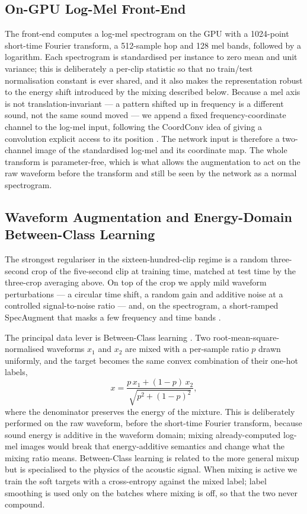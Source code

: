 \documentclass[conference]{IEEEtran}
\begin{document}
\subsection{On-GPU Log-Mel Front-End}
The front-end computes a log-mel spectrogram on the GPU with a 1024-point short-time Fourier transform, a 512-sample hop and 128 mel bands, followed by a logarithm. Each spectrogram is standardised per instance to zero mean and unit variance; this is deliberately a per-clip statistic so that no train/test normalisation constant is ever shared, and it also makes the representation robust to the energy shift introduced by the mixing described below. Because a mel axis is not translation-invariant --- a pattern shifted up in frequency is a different sound, not the same sound moved --- we append a fixed frequency-coordinate channel to the log-mel input, following the CoordConv idea of giving a convolution explicit access to its position \cite{liu_coordconv}. The network input is therefore a two-channel image of the standardised log-mel and its coordinate map. The whole transform is parameter-free, which is what allows the augmentation to act on the raw waveform before the transform and still be seen by the network as a normal spectrogram.

\subsection{Waveform Augmentation and Energy-Domain Between-Class Learning}\label{sec:aug}
The strongest regulariser in the sixteen-hundred-clip regime is a random three-second crop of the five-second clip at training time, matched at test time by the three-crop averaging above. On top of the crop we apply mild waveform perturbations --- a circular time shift, a random gain and additive noise at a controlled signal-to-noise ratio --- and, on the spectrogram, a short-ramped SpecAugment that masks a few frequency and time bands \cite{park_specaugment}.

The principal data lever is Between-Class learning \cite{tokozume_bc}. Two root-mean-square-normalised waveforms $x_1$ and $x_2$ are mixed with a per-sample ratio $p$ drawn uniformly, and the target becomes the same convex combination of their one-hot labels,
\begin{equation}
x = \frac{p\,x_1 + (1-p)\,x_2}{\sqrt{p^2 + (1-p)^2}}, \label{eq:bc}
\end{equation}
where the denominator preserves the energy of the mixture. This is deliberately performed on the raw waveform, before the short-time Fourier transform, because sound energy is additive in the waveform domain; mixing already-computed log-mel images would break that energy-additive semantics and change what the mixing ratio means. Between-Class learning is related to the more general mixup \cite{zhang_mixup} but is specialised to the physics of the acoustic signal. When mixing is active we train the soft targets with a cross-entropy against the mixed label; label smoothing \cite{muller_labelsmoothing} is used only on the batches where mixing is off, so that the two never compound.
\end{document}
